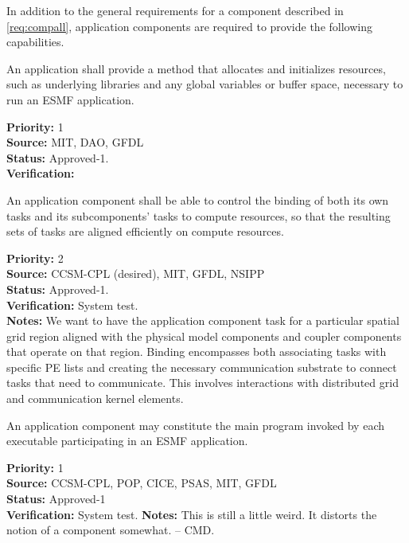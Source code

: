 
In addition to the general requirements for a component described in 
\ref{req:compall}, application components are required to provide the
following capabilities.

An application shall provide a method that allocates and initializes 
resources, such as underlying libraries and any global variables or 
buffer space, necessary to run an ESMF application.
\begin{reqlist}
{\bf Priority:} 1 \\
{\bf Source:} MIT, DAO, GFDL \\
{\bf Status:} Approved-1.\\
{\bf Verification:}  
\end{reqlist}


An application component shall be able to control the binding of both its own
tasks and its subcomponents' tasks to compute resources, so that the resulting
sets of tasks are aligned efficiently on compute resources.

\begin{reqlist}
{\bf Priority:} 2 \\
{\bf Source:}  CCSM-CPL (desired), MIT, GFDL, NSIPP \\
{\bf Status:} Approved-1. \\
{\bf Verification:} System test.\\
{\bf Notes:}  We want to have the application component task for a particular
  spatial grid region aligned with the physical model components and
  coupler components that operate on that region.  Binding
  encompasses both associating tasks with specific PE lists and
  creating the necessary communication substrate to connect tasks that
  need to communicate.  This involves interactions with distributed
  grid and communication kernel elements.
\end{reqlist}

An application component may constitute the main program invoked by each
executable participating in an ESMF application.
\begin{reqlist}
{\bf Priority:} 1\\
{\bf Source:} CCSM-CPL, POP, CICE, PSAS, MIT, GFDL \\
{\bf Status:} Approved-1 \\
{\bf Verification:} System test.
{\bf Notes:}  This is still a little weird.  It distorts the notion of a
component somewhat.  -- CMD.
\end{reqlist}

